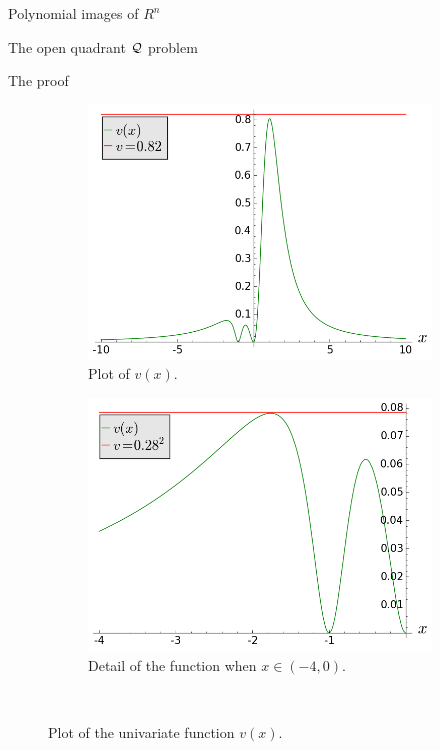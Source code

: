 \documentclass[11pt, a4paper, english, twoside, notitlepage]{report}
\begin{document}
\begin{chapter}{Polynomial images of $R^n$}
\begin{section}{The open quadrant $\mathcal{Q}$ problem}
\begin{subsection}{The proof}
\begin{Proof}
		\begin{figure}[h]\hspace{-1.5cm}
			\begin{subfigure}{.6\linewidth}\centering
				\includegraphics[width=1\textwidth]{plots/ch1_10_uve.png}
				\caption{Plot of $v(x)$.\label{fig:uve}}
			\end{subfigure}
			\begin{subfigure}{.6\linewidth}\centering
				\includegraphics[width=1\textwidth]{plots/ch1_11_uve_detail.png}
				\caption{Detail of the function when $x \in (-4, 0)$.\label{fig:uveDetail}}
			\end{subfigure}\\[1ex]
			\caption{Plot of the univariate function $v(x)$.\label{fig:v(x)}}
		\end{figure}
		

\end{Proof}
\end{subsection}
\end{section}
\end{chapter}
\end{document}
